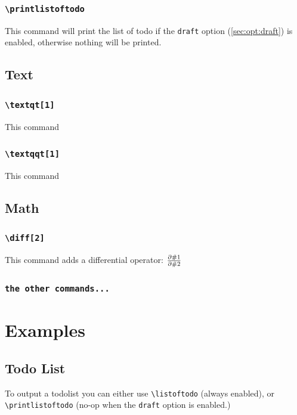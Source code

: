 \documentclass{article}
\begin{document}
\subsubsection{\texttt{\textbackslash printlistoftodo}}
    This command will print the list of todo if the \texttt{draft} option (\cref{sec:opt:draft}) is enabled, otherwise nothing will be printed.

\subsection{Text}

\subsubsection{\texttt{\textbackslash textqt[1]}}
    This command 

\subsubsection{\texttt{\textbackslash textqqt[1]}}
    This command 

\subsection{Math}

\subsubsection{\texttt{\textbackslash diff[2]}}
    This command adds a differential operator: $\frac{\partial \#1}{\partial \#2}$

\subsubsection{\texttt{the other commands...}}

\section{Examples}
\subsection{Todo List}
To output a todolist you can either use \texttt{\textbackslash listoftodo} (always enabled), or \texttt{\textbackslash printlistoftodo} (no-op when the \texttt{draft} option is enabled.)

\printlistoftodo
\end{document}

